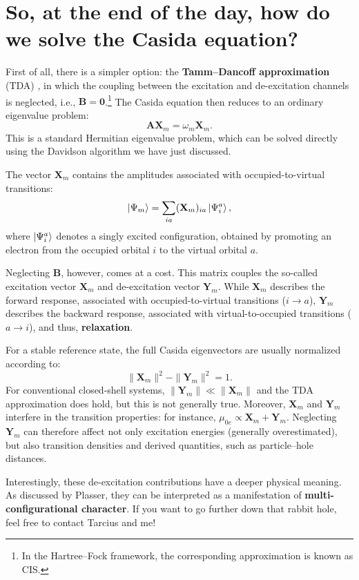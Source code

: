 \documentclass[10pt,aspectratio=169]{beamer}
\begin{document}
\section{So, at the end of the day, how do we solve the Casida equation?}

\begin{frame}
	First of all, there is a simpler option: the \textbf{Tamm--Dancoff approximation} (TDA) , in which the coupling between the excitation and de-excitation channels is neglected, i.e., $\mathbf B=\mathbf 0$.\footnote{In the Hartree--Fock framework, the corresponding approximation is known as CIS.}
	The Casida equation then reduces to an ordinary eigenvalue problem:
	\begin{equation*}
		\boxed{\mathbf A\mathbf X_m=\omega_m\mathbf X_m.}
	\end{equation*}
	This is a standard Hermitian eigenvalue problem, which can be solved directly using the Davidson algorithm we have just discussed.
	
	\pause
	\medskip
	The vector $\mathbf X_m$ contains the amplitudes associated with occupied-to-virtual transitions:
	\begin{equation*}
		\ket{\Psi_m}=\sum_{ia}(\mathbf X_m)_{ia}\ket{\Psi_i^a},
	\end{equation*}
	where $\ket{\Psi_i^a}$ denotes a singly excited configuration, obtained by promoting an electron from the occupied orbital $i$ to the virtual orbital $a$.
\end{frame}

\begin{frame}
	Neglecting $\mathbf B$, however, comes at a cost. This matrix couples the so-called excitation vector $\mathbf X_m$ and de-excitation vector $\mathbf Y_m$.
	While $\mathbf X_m$ describes the forward response, associated with occupied-to-virtual transitions ($i\to a$), $\mathbf Y_m$ describes the backward response, associated with virtual-to-occupied transitions ($a\to i$), and thus, \textbf{relaxation}.
	
	\pause
	\medskip
	For a stable reference state, the full Casida eigenvectors are usually normalized according to:
	\begin{equation*}
		\|\mathbf X_m\|^2-\|\mathbf Y_m\|^2=1.
	\end{equation*}
	For conventional closed-shell systems, $\|\mathbf Y_m\| \ll \|\mathbf X_m\|$ and the TDA approximation does hold, but this is not generally true.
	Moreover, $\mathbf X_m$ and $\mathbf Y_m$ interfere in the transition properties: for instance, $\mu_{0e} \propto \mathbf X_m+\mathbf Y_m$. 
	Neglecting $\mathbf Y_m$ can therefore affect not only excitation energies (generally overestimated), but also transition densities and derived quantities, such as particle--hole distances.
	
	\pause
	\medskip
	Interestingly, these de-excitation contributions have a deeper physical meaning. As discussed by Plasser, they can be interpreted as a manifestation of \textbf{multi-configurational character}.
	If you want to go further down that rabbit hole, feel free to contact Tarcius and me!
\end{frame}
\end{document}

